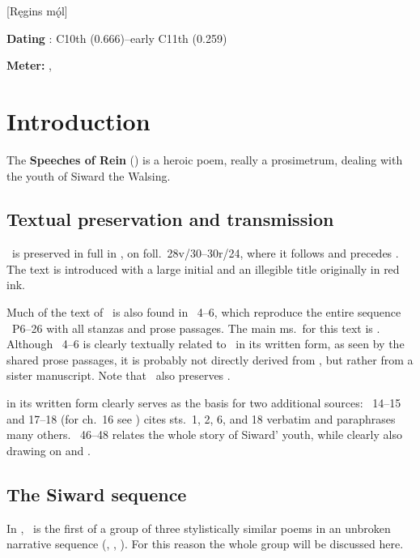 [Ręgins mǫ́l]

\begin{flushright}%
\textbf{Dating} \parencite{Sapp2022}: C10th (0.666)--early C11th (0.259)

\textbf{Meter:} \Ljodahattr, \Fornyrdislag%
\end{flushright}

\section{Introduction}

The \textbf{Speeches of Rein} () is a heroic poem, really a prosimetrum, dealing with the youth of Siward the Walsing.

\subsection{Textual preservation and transmission}

\Reginsmal\ is preserved in full in \Regius, on foll.~28v/30--30r/24, where it follows  and precedes .  The text is introduced with a large initial and an illegible title originally in red ink.

Much of the text of \Reginsmal\ is also found in \Nornagest\ 4--6, which reproduce the entire sequence \Reginsmal\ P6--26 with all stanzas and prose passages.  The main ms.~for this text is \FlatMS.  Although \Nornagest\ 4--6 is clearly textually related to \Reginsmal\ in its written form, as seen by the shared prose passages, it is probably not directly derived from \Regius, but rather from a sister manuscript.  Note that \Nornagest\ also preserves .

 in its written form clearly serves as the basis for two additional sources: \VolsungaSaga\ 14--15 and 17--18 (for ch.~16 see ) cites sts.~1, 2, 6, and 18 verbatim and paraphrases many others.  \Skaldskaparmal\ 46--48 relates the whole story of Siward’ youth, while clearly also drawing on  and .

\subsection{The Siward sequence}

In \Regius, \Reginsmal\ is the first of a group of three stylistically similar poems in an unbroken narrative sequence (\Reginsmal, , ).  For this reason the whole group will be discussed here.

